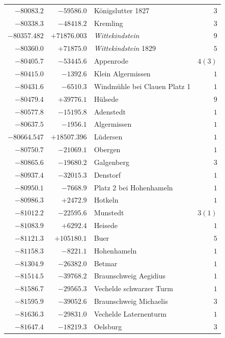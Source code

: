 \begin{center}
\begin{tabular}{r|r|p{170pt}|r}
\(-80083.2\)&\(-59586.0\)&Königslutter 1827&\(3\)\\
\(-80338.3\)&\(-48418.2\)&Kremling&\(3\)\\
\(-80357.482\)&\(+71876.003\)&\textit{Wittekindstein}&\(9\)\\
\(-80360.0\)&\(+71875.0\)&\textit{Wittekindstein} 1829&\(5\)\\
\(-80405.7\)&\(-53445.6\)&Appenrode&\(4 (3)\)\\
\(-80415.0\)&\(-1392.6\)&Klein Algermissen&\(1\)\\
\(-80431.6\)&\(-6510.3\)&Windmühle bei Clauen Platz 1&\(1\)\\
\(-80479.4\)&\(+39776.1\)&Hülsede&\(9\)\\
\(-80577.8\)&\(-15195.8\)&Adenstedt&\(1\)\\
\(-80637.5\)&\(-1956.1\)&Algermissen&\(1\)\\
\(-80664.547\)&\(+18507.396\)&Lüdersen&\(1\)\\
\(-80750.7\)&\(-21069.1\)&Obergen&\(1\)\\
\(-80865.6\)&\(-19680.2\)&Galgenberg&\(3\)\\
\(-80937.4\)&\(-32015.3\)&Denstorf&\(1\)\\
\(-80950.1\)&\(-7668.9\)&Platz 2 bei Hohenhameln&\(1\)\\
\(-80986.3\)&\(+2472.9\)&Hotkeln&\(1\)\\
\(-81012.2\)&\(-22595.6\)&Munstedt&\(3 (1)\)\\
\(-81083.9\)&\(+6292.4\)&Heisede&\(1\)\\
\(-81121.3\)&\(+105180.1\)&Buer&\(5\)\\
\(-81158.3\)&\(-8221.1\)&Hohenhameln&\(1\)\\
\(-81304.9\)&\(-26382.0\)&Betmar&\(1\)\\
\(-81514.5\)&\(-39768.2\)&Braunschweig Aegidius&\(1\)\\
\(-81586.7\)&\(-29565.3\)&Vechelde schwarzer Turm&\(1\)\\
\(-81595.9\)&\(-39052.6\)&Braunschweig Michaelis&\(3\)\\
\(-81636.3\)&\(-29831.0\)&Vechelde Laternenturm&\(1\)\\
\(-81647.4\)&\(-18219.3\)&Oelsburg&\(3\)\\
\hline\end{tabular}\endgroup\end{center}
